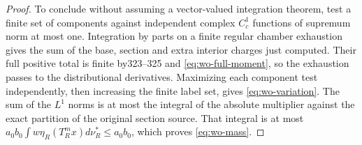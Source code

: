 \begin{proof}
To conclude without assuming a vector-valued integration theorem,
test a finite set of components against independent complex
$C_c^1$ functions of supremum norm at most one.  Integration by
parts on a finite regular chamber exhaustion gives the sum of
the base, section and extra interior charges just computed.
Their full positive total is finite by323--325 and
\eqref{eq:wo-full-moment}, so the exhaustion passes to the
distributional derivatives.  Maximizing each component test
independently, then increasing the finite label set, gives
\eqref{eq:wo-variation}.  The sum of the $L^1$ norms is at most
the integral of the absolute multiplier against the exact
partition of the original section source.  That integral is
at most $a_0b_0\int w\eta_R(T_R^mx)d\nu_R^*\le a_0b_0$,
which proves \eqref{eq:wo-mass}.
\end{proof}

